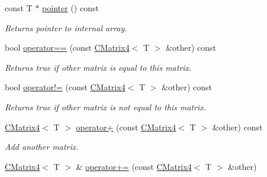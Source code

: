 \begin{DoxyCompactItemize}
\mbox{\label{classirr_1_1core_1_1CMatrix4_a4d258434b1baa3a52f1ae35903ca97f9}} 
const T $\ast$ \hyperlink{classirr_1_1core_1_1CMatrix4_a4d258434b1baa3a52f1ae35903ca97f9}{pointer} () const
\begin{DoxyCompactList}\small\item\em Returns pointer to internal array. \end{DoxyCompactList}\item 
\mbox{\label{classirr_1_1core_1_1CMatrix4_abcff3ee7f4d4e1c9ff23193ca0827d16}} 
bool \hyperlink{classirr_1_1core_1_1CMatrix4_abcff3ee7f4d4e1c9ff23193ca0827d16}{operator==} (const \hyperlink{classirr_1_1core_1_1CMatrix4}{C\+Matrix4}$<$ T $>$ \&other) const
\begin{DoxyCompactList}\small\item\em Returns true if other matrix is equal to this matrix. \end{DoxyCompactList}\item 
\mbox{\label{classirr_1_1core_1_1CMatrix4_a58b6bf4873a479ad15e809706e02e2cf}} 
bool \hyperlink{classirr_1_1core_1_1CMatrix4_a58b6bf4873a479ad15e809706e02e2cf}{operator!=} (const \hyperlink{classirr_1_1core_1_1CMatrix4}{C\+Matrix4}$<$ T $>$ \&other) const
\begin{DoxyCompactList}\small\item\em Returns true if other matrix is not equal to this matrix. \end{DoxyCompactList}\item 
\mbox{\label{classirr_1_1core_1_1CMatrix4_a9c18e8d97db361917c2dea5ed59b1ea5}} 
\hyperlink{classirr_1_1core_1_1CMatrix4}{C\+Matrix4}$<$ T $>$ \hyperlink{classirr_1_1core_1_1CMatrix4_a9c18e8d97db361917c2dea5ed59b1ea5}{operator+} (const \hyperlink{classirr_1_1core_1_1CMatrix4}{C\+Matrix4}$<$ T $>$ \&other) const
\begin{DoxyCompactList}\small\item\em Add another matrix. \end{DoxyCompactList}\item 
\mbox{\label{classirr_1_1core_1_1CMatrix4_a00b1ed3d9af10bc35462231de0eff788}} 
\hyperlink{classirr_1_1core_1_1CMatrix4}{C\+Matrix4}$<$ T $>$ \& \hyperlink{classirr_1_1core_1_1CMatrix4_a00b1ed3d9af10bc35462231de0eff788}{operator+=} (const \hyperlink{classirr_1_1core_1_1CMatrix4}{C\+Matrix4}$<$ T $>$ \&other)

\end{DoxyCompactItemize}

